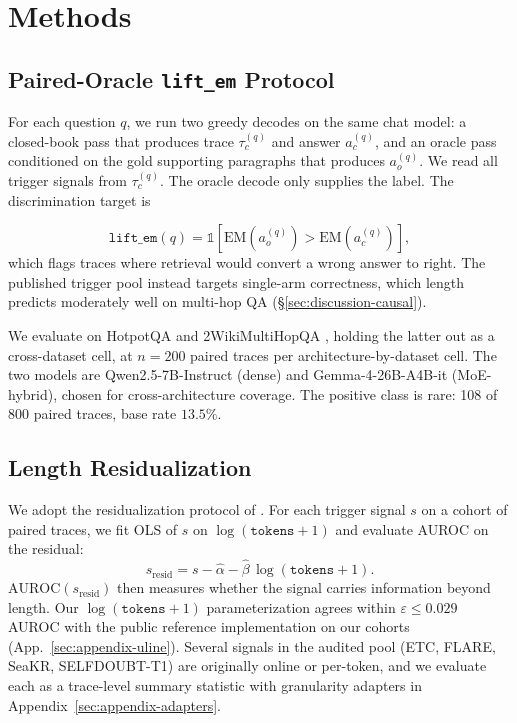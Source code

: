 \documentclass[11pt]{article}
\begin{document}
\section{Methods}
\label{sec:methods}

\subsection{Paired-Oracle \texttt{lift\_em} Protocol}
\label{sec:methods-protocol}

For each question $q$, we run two greedy decodes on the same chat model: a closed-book pass that produces trace $\tau_c^{(q)}$ and answer $a_c^{(q)}$, and an oracle pass conditioned on the gold supporting paragraphs that produces $a_o^{(q)}$. We read all trigger signals from $\tau_c^{(q)}$. The oracle decode only supplies the label. The discrimination target is

\begin{equation}
\texttt{lift\_em}(q) = \mathbb{1}\!\left[\mathrm{EM}(a_o^{(q)}) > \mathrm{EM}(a_c^{(q)})\right],
\label{eq:lift-em}
\end{equation}
which flags traces where retrieval would convert a wrong answer to right. The published trigger pool instead targets single-arm correctness, which length predicts moderately well on multi-hop QA (\S\ref{sec:discussion-causal}).

We evaluate on HotpotQA \citep{yang_hotpotqa_2018} and 2WikiMultiHopQA \citep{ho_constructing_2020}, holding the latter out as a cross-dataset cell, at $n{=}200$ paired traces per architecture-by-dataset cell. The two models are Qwen2.5-7B-Instruct (dense) and Gemma-4-26B-A4B-it (MoE-hybrid), chosen for cross-architecture coverage. The positive class is rare: 108 of 800 paired traces, base rate $13.5\%$.

\subsection{Length Residualization}
\label{sec:methods-residualization}

We adopt the residualization protocol of \citet{vashurin_uncertainty-line_2025}. For each trigger signal $s$ on a cohort of paired traces, we fit OLS of $s$ on $\log(\texttt{tokens}+1)$ and evaluate AUROC on the residual:
\begin{equation}
s_{\text{resid}} = s - \hat{\alpha} - \hat{\beta}\,\log(\texttt{tokens} + 1).
\label{eq:residualize}
\end{equation}
$\mathrm{AUROC}(s_{\text{resid}})$ then measures whether the signal carries information beyond length. Our $\log(\texttt{tokens}+1)$ parameterization agrees within $\varepsilon \leq 0.029$ AUROC with the public reference implementation on our cohorts (App.~\ref{sec:appendix-uline}). Several signals in the audited pool (ETC, FLARE, SeaKR, SELFDOUBT-T1) are originally online or per-token, and we evaluate each as a trace-level summary statistic with granularity adapters in Appendix~\ref{sec:appendix-adapters}.
\end{document}
